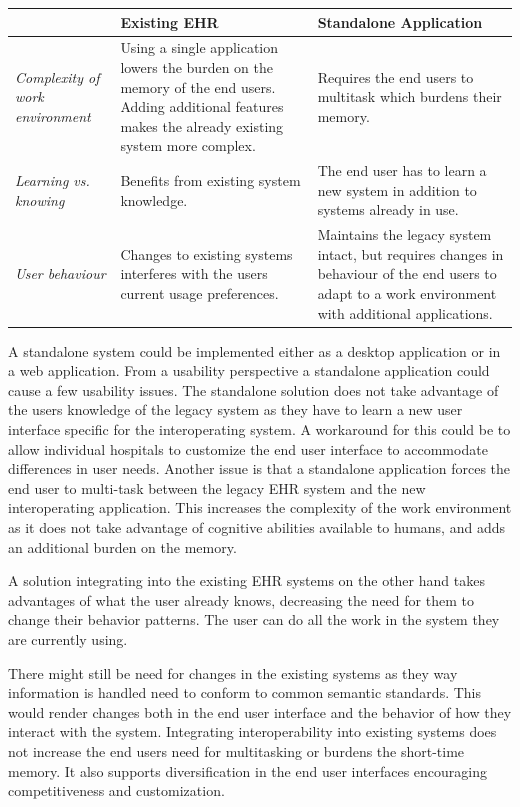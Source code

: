 \documentclass[14pt]{article}
\begin{document}
\begin{center}
	\begin{tabular} { | l | p{4.5cm} | p{4.5cm} |}
	\hline
	& Existing \gls{EHR} & Standalone Application \\ \hline
	\emph{Complexity of work environment} & Using a single application lowers the burden on the memory of the end users. Adding additional features makes the already existing system more complex. & Requires the end users to multitask which burdens their memory. \\ \hline
	\emph{Learning vs. knowing} & Benefits from existing system knowledge. & The end user has to learn a new system in addition to systems already in use. \\ \hline
	\emph{User behaviour} & Changes to existing systems interferes with the users current usage preferences. & Maintains the legacy system intact, but requires changes in behaviour of the end users to adapt to a work environment with additional applications. \\ 
	\hline
	\end{tabular}
\end{center}

A standalone system could be implemented either as a desktop application or in a web application. From a usability perspective a standalone application could cause a few usability issues. The standalone solution does not take advantage of the users knowledge of the legacy system as they have to learn a new user interface specific for the interoperating system. A workaround for this could be to allow individual hospitals to customize the end user interface to accommodate differences in user needs. 
Another issue is that a standalone application forces the end user to multi-task between the legacy \gls{EHR} system and the new interoperating application. This increases the complexity of the work environment as it does not take advantage of cognitive abilities available to humans, and adds an additional burden on the memory. 

A solution integrating into the existing \gls{EHR} systems on the other hand takes advantages of what the user already knows, decreasing the need for them to change their behavior patterns. The user can do all the work in the system they are currently using.

There might still be need for changes in the existing systems as they way information is handled need to conform to common semantic standards. This would render changes both in the end user interface and the behavior of how they interact with the system. Integrating interoperability into existing systems does not increase the end users need for multitasking or burdens the short-time memory. It also supports diversification in the end user interfaces encouraging competitiveness and customization.
\end{document}
